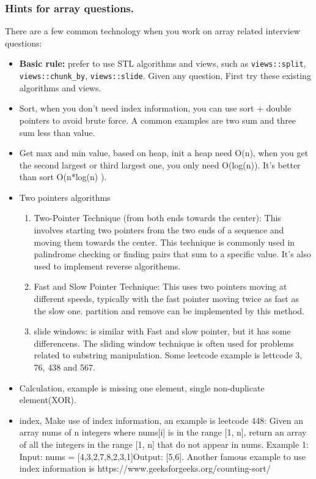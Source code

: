 \documentclass[a4paper,11pt,twoside]{book}
\begin{document}
\subsubsection{Hints for array questions.}
There are a few common technology when you work on array related interview questions:

\begin{itemize}
	\item \textbf{Basic rule:} prefer to use STL algorithms and views, such as \texttt{views::split}, \texttt{views::chunk\_by}, \texttt{views::slide}. Given any question, First try these existing algorithms and views.
	
	
	\item Sort, when you don't need index information, you can use sort + double pointers to avoid brute force. A common examples are two sum and three sum less than value. 
	
	\item Get max and min value, based on heap, init a heap need O(n), when you get the second largest or third largest one, you only need O(log(n)). It's better than sort O(n*log(n) ). 

	\item Two pointers algorithms
	\begin{enumerate}
		\item Two-Pointer Technique (from both ends towards the center): This involves starting two pointers from the two ends of a sequence and moving them towards the center. This technique is commonly used in palindrome checking or finding pairs that sum to a specific value. It's also used to implement reverse algorithems. 
		
		\item Fast and Slow Pointer Technique: This uses two pointers moving at different speeds, typically with the fast pointer moving twice as fast as the slow one. partition and remove can be implemented by this method. 
		
		\item slide windows: is similar with Fast and slow pointer, but it has some differencens. The sliding window technique is often used for problems related to substring manipulation. Some leetcode example is lettcode 3, 76, 438 and 567.
	\end{enumerate}	
	
	\item Calculation, example is missing one element, single non-duplicate element(XOR).
	
	\item index, Make use of index information, an example is leetcode 448: Given an array nums of n integers where nums[i] is in the range [1, n], return an array of all the integers in the range [1, n] that do not appear in nums. Example 1: Input: nums = [4,3,2,7,8,2,3,1]Output: [5,6]. Another famous example to use index information is  https://www.geeksforgeeks.org/counting-sort/
	

\end{itemize}
\end{document}
